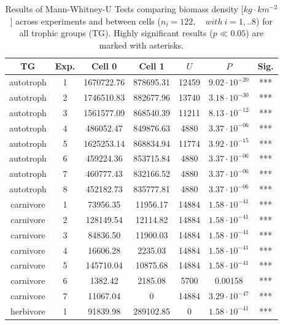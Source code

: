 \begin{table}[ht!]
\centering
\caption[Comparison of biomass density between cells]{Results of Mann-Whitney-U Tests comparing biomass density [$kg\cdot km^{-2}$] across experiments and 
               between cells ($n_i = 122, \quad with~i = 1,..8$) for all trophic groups (TG). Highly 
               significant results ($p \ll 0.05$) are marked with asterisks.} 
\label{tab:chap:res:comp}
\begin{tabular*}{\textwidth}{@{\extracolsep{\fill} }ccccccc}
  \toprule
\textbf{TG} & \textbf{Exp.} & \textbf{Cell 0} & \textbf{Cell 1} & \textbf{$U$} & \textbf{$P$} & \textbf{Sig.} \\ 
  \midrule
autotroph & 1 & 1670722.76 & 878695.31 & 12459 & $9.02\cdot 10^{-20}$ & *** \\ 
  autotroph & 2 & 1746510.83 & 882677.96 & 13740 & $3.18\cdot 10^{-30}$ & *** \\ 
  autotroph & 3 & 1561577.09 & 868540.39 & 11211 & $8.13\cdot 10^{-12}$ & *** \\ 
  autotroph & 4 & 486052.47 & 849876.63 & 4880 & $3.37\cdot 10^{-06}$ & *** \\ 
  autotroph & 5 & 1625253.14 & 868834.94 & 11774 & $3.92\cdot 10^{-15}$ & *** \\ 
  autotroph & 6 & 459224.36 & 853715.84 & 4880 & $3.37\cdot 10^{-06}$ & *** \\ 
  autotroph & 7 & 460777.43 & 832166.52 & 4880 & $3.37\cdot 10^{-06}$ & *** \\ 
  autotroph & 8 & 452182.73 & 835777.81 & 4880 & $3.37\cdot 10^{-06}$ & *** \\ 
   [1ex]carnivore & 1 & 73956.35 & 11956.17 & 14884 & $1.58\cdot 10^{-41}$ & *** \\ 
  carnivore & 2 & 128149.54 & 12114.82 & 14884 & $1.58\cdot 10^{-41}$ & *** \\ 
  carnivore & 3 & 84836.50 & 11900.03 & 14884 & $1.58\cdot 10^{-41}$ & *** \\ 
  carnivore & 4 & 16606.28 & 2235.03 & 14884 & $1.58\cdot 10^{-41}$ & *** \\ 
  carnivore & 5 & 145710.04 & 10875.68 & 14884 & $1.58\cdot 10^{-41}$ & *** \\ 
  carnivore & 6 & 1382.42 & 2185.08 & 5700 & 0.00158 & *** \\ 
  carnivore & 7 & 11067.04 & 0 & 14884 & $3.29\cdot 10^{-47}$ & *** \\ 
   [1ex]herbivore & 1 & 91839.98 & 289102.85 & 0 & $1.58\cdot 10^{-41}$ & *** \\ 

\end{tabular*}
\end{table}
